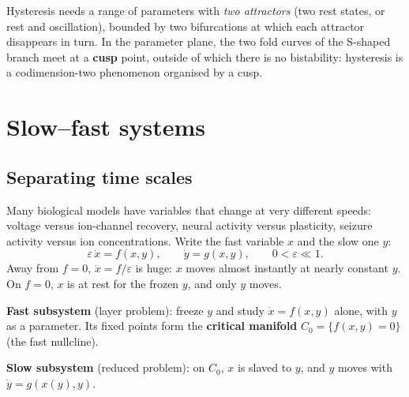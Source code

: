 \documentclass[11pt,openany]{report}
\newcommand{\eps}{\varepsilon}
\begin{document}
\begin{keyidea}
Hysteresis needs a range of parameters with \emph{two attractors} (two rest states, or rest and oscillation), bounded
by two bifurcations at which each attractor disappears in turn. In the parameter plane, the two fold curves of the
S-shaped branch meet at a \textbf{cusp} point, outside of which there is no bistability: hysteresis is a codimension-two
phenomenon organised by a cusp.
\end{keyidea}

\chapter{Slow--fast systems}
\section{Separating time scales}
Many biological models have variables that change at very different speeds: voltage versus ion-channel recovery,
neural activity versus plasticity, seizure activity versus ion concentrations. Write the fast variable $x$ and the slow
one $y$:
\[
\eps\,\dot x = f(x,y),\qquad \dot y = g(x,y),\qquad 0<\eps\ll1 .
\]
Away from $f=0$, $\dot x = f/\eps$ is huge: $x$ moves almost instantly at nearly constant $y$. On $f = 0$, $x$ is at rest
for the frozen $y$, and only $y$ moves.

\begin{keyidea}
\textbf{Fast subsystem} (layer problem): freeze $y$ and study $\dot x = f(x,y)$ alone, with $y$ as a parameter. Its fixed
points form the \textbf{critical manifold} $C_0 = \{f(x,y) = 0\}$ (the fast nullcline).

\textbf{Slow subsystem} (reduced problem): on $C_0$, $x$ is slaved to $y$, and $y$ moves with $\dot y = g(x(y), y)$.
\end{keyidea}
\end{document}
